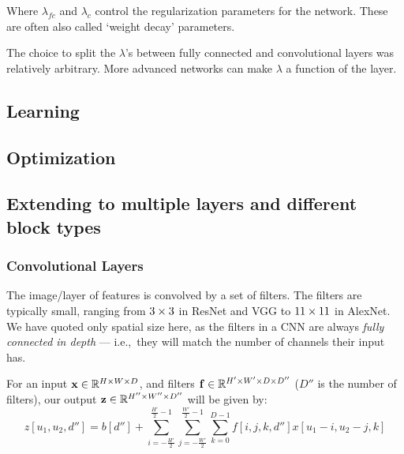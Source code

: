   Where $\lambda_{fc}$ and $\lambda_{c}$ control the regularization parameters
  for the network. These are often also called `weight decay' parameters.

  The choice to split the $\lambda$'s between fully connected and convolutional
  layers was relatively arbitrary. More advanced networks can make $\lambda$
  a function of the layer. 


\subsection{Learning}

\subsection{Optimization}

\subsection{Extending to multiple layers and different block types}
\begin{figure}
  \centering
  
\end{figure}

\subsubsection{Convolutional Layers}
  The image/layer of features is convolved by a set of filters.
  The filters are typically small, ranging from $3\times 3$ in ResNet and VGG
  to $11\times 11$ in AlexNet. We have quoted only spatial size
  here, as the filters in a CNN are always \emph{fully connected in depth} ---
  i.e.,\ they will match the number of channels their input has.

  For an input $\mathbf{x} \in \mathbb{R}^{H\times W\times D}$, and filters 
  $\mathbf{f} \in \mathbb{R}^{H'\times W'  \times D \times D''}$ ($D''$ is the 
  number of filters), our output $\mathbf{z} \in
  \mathbb{R}^{H''\times W'' \times D''}$ will be given by:
  \begin{equation}
    z[u_1, u_2, d''] = b[d''] + \sum_{i=-\frac{H'}{2}}^{\frac{H'}{2}-1}
                       \sum_{j=-\frac{W'}{2}}^{\frac{W'}{2}-1}  \sum_{k=0}^{D-1}  
                        f[i, j, k, d''] x[u_1-i, u_2-j, k]
  \end{equation}


